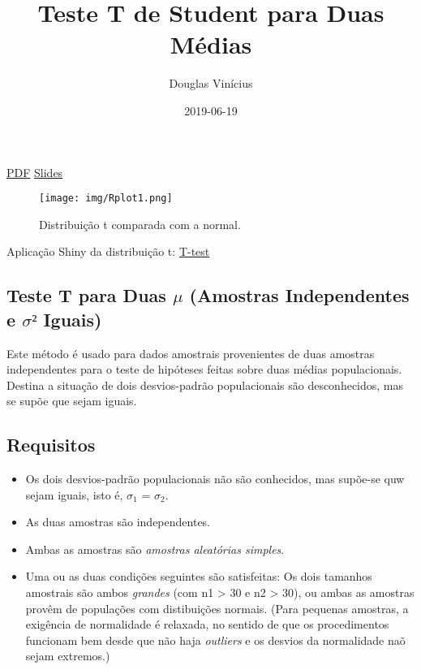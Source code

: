 \documentclass[]{article}
\title{Teste T de Student para Duas Médias}
\author{Douglas Vinícius}
\date{2019-06-19}
\providecommand{\tightlist}{%
  \setlength{\itemsep}{0pt}\setlength{\parskip}{0pt}}
\begin{document}
\maketitle

\href{pdf/slides2.pdf}{PDF} \href{slides/t-test.html}{Slides}

\begin{figure}
\centering
\texttt{[image: img/Rplot1.png]}
\caption{Distribuição t comparada com a normal.}
\end{figure}

Aplicação Shiny da distribuição t:
\href{https://douglas-vincius.shinyapps.io/T-test-shiny/}{T-test}

\hypertarget{teste-t-para-duas-mu-amostras-independentes-e-sigma-iguais}{%
\subsection{\texorpdfstring{Teste T para Duas \(\mu\) (Amostras
Independentes e \(\sigma²\)
Iguais)}{Teste T para Duas \textbackslash{}mu (Amostras Independentes e \textbackslash{}sigma² Iguais)}}\label{teste-t-para-duas-mu-amostras-independentes-e-sigma-iguais}}

Este método é usado para dados amostrais provenientes de duas amostras
independentes para o teste de hipóteses feitas sobre duas médias
populacionais. Destina a situação de dois desvios-padrão populacionais
são desconhecidos, mas se supõe que sejam iguais.

\hypertarget{requisitos}{%
\subsection{Requisitos}\label{requisitos}}

\begin{itemize}
\tightlist
\item
  Os dois desvios-padrão populacionais não são conhecidos, mas supõe-se
  quw sejam iguais, isto é, \(\sigma_{1}\) = \(\sigma_{2}\).
\item
  As duas amostras são independentes.
\item
  Ambas as amostras são \emph{amostras aleatórias simples}.
\item
  Uma ou as duas condições seguintes são satisfeitas: Os dois tamanhos
  amostrais são ambos \emph{grandes} (com n1 \textgreater{} 30 e n2
  \textgreater{} 30), ou ambas as amostras provêm de populações com
  distibuições normais. (Para pequenas amostras, a exigência de
  normalidade é relaxada, no sentido de que os procedimentos funcionam
  bem desde que não haja \emph{outliers} e os desvios da normalidade naõ
  sejam extremos.)
\end{itemize}
\end{document}

